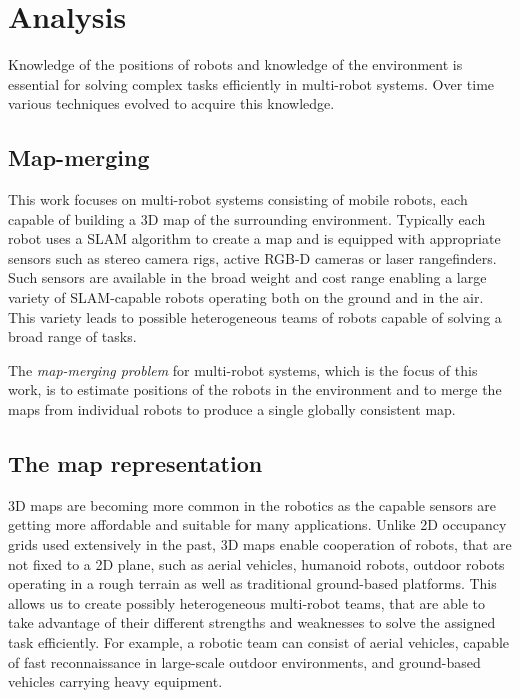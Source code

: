 \chapter{Analysis}
\label{chap:analysis}

Knowledge of the positions of robots and knowledge of the environment is essential for solving complex tasks efficiently in multi-robot systems. Over time various techniques evolved to acquire this knowledge.

\section{Map-merging}

This work focuses on multi-robot systems consisting of mobile robots, each capable of building a \gls{3D} map of the surrounding environment. Typically each robot uses a \gls{SLAM} algorithm to create a map and is equipped with appropriate sensors such as stereo camera rigs, active \gls{RGB-D} cameras or laser rangefinders. Such sensors are available in the broad weight and cost range enabling a large variety of \gls{SLAM}-capable robots operating both on the ground and in the air. This variety leads to possible heterogeneous teams of robots capable of solving a broad range of tasks.

The \textit{map-merging problem} for multi-robot systems, which is the focus of this work, is to estimate positions of the robots in the environment and to merge the maps from individual robots to produce a single globally consistent map.

\section{The map representation}

\Gls{3D} maps are becoming more common in the robotics as the capable sensors are getting more affordable and suitable for many applications. Unlike \gls{2D} occupancy grids used extensively in the past, \gls{3D} maps enable cooperation of robots, that are not fixed to a \gls{2D} plane, such as aerial vehicles, humanoid robots, outdoor robots operating in a rough terrain as well as traditional ground-based platforms. This allows us to create possibly heterogeneous multi-robot teams, that are able to take advantage of their different strengths and weaknesses to solve the assigned task efficiently. For example, a robotic team can consist of aerial vehicles, capable of fast reconnaissance in large-scale outdoor environments, and ground-based vehicles carrying heavy equipment.

